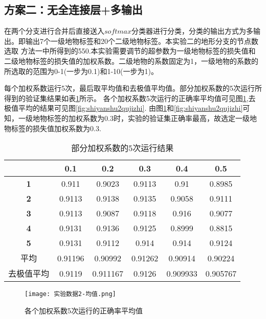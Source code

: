 \documentclass[lang=cn,11pt,a4paper,cite=authoryear]{elegantpaper}
\begin{document}
\subsection{方案二：无全连接层+多输出}
在两个分支进行合并后直接送入$softmax$分类器进行分类，分类的输出方式为多输出。即输出7个一级地物标签和20个二级地物标签。本实验二的地形分支的节点数选取
方法一中所得到的550.本实验需要调节的超参数为一级地物标签的损失值和二级地物标签的损失值的加权系数。二级地物的系数固定为1，一级地物的系数的所选取的范围为0-1(一步为0.1)和1-10(一步为1)。

每个加权系数运行5次，最后取平均值和去极值平均值。部分加权系数的5次运行所得到的验证集结果如表\ref{tab:table2}所示。
各个加权系数5次运行的正确率平均值可见图\ref{fig:shiyanshu2junzhi},去极值平均的结果可见图\ref{fig:shiyanshu2qujizhi}.
由图\ref{fig:shiyanshu2junzhi}和\ref{fig:shiyanshu2qujizhi}可知，一级地物标签的加权系数为0.3时，实验的验证集正确率最高，故选定一级地物标签的损失值加权系数为0.3.

\begin{table}[htbp]
  \centering
  \caption{部分加权系数的5次运行结果}
    \begin{tabular}{|c|c|c|c|c|c|}
    \toprule
          & \textbf{0.1} & \textbf{0.2} & \textbf{0.3} & \textbf{0.4} & \textbf{0.5} \\
    \midrule
    \textbf{1} & 0.911 & 0.9023 & 0.9113 & 0.91  & 0.8985 \\
    \midrule
    \textbf{2} & 0.9113 & 0.9138 & 0.9135 & 0.9058 & 0.9111 \\
    \midrule
    \textbf{3} & 0.9113 & 0.9087 & 0.9118 & 0.916 & 0.9077 \\
    \midrule
    \textbf{4} & 0.9131 & 0.9136 & 0.9125 & 0.8999 & 0.8815 \\
    \midrule
    \textbf{5} & 0.9131 & 0.9112 & 0.914 & 0.914 & 0.9124 \\
    \midrule
    平均    & \cellcolor[rgb]{ 1,  0,  0}0.91196 & 0.90992 & \cellcolor[rgb]{ .753,  0,  0}0.91262 & 0.90914 & 0.90224 \\
    \midrule
    去极值平均 & \cellcolor[rgb]{ 1,  0,  0}0.9119 & 0.911167 & \cellcolor[rgb]{ .753,  0,  0}0.9126 & 0.909933 & 0.905767 \\
    \bottomrule
    \end{tabular}%
  \label{tab:table2}%
\end{table}%

\begin{figure}[!htb]
  \centering
  \texttt{[image: 实验数据2-均值.png]}
  \caption{各个加权系数5次运行的正确率平均值}
  \label{fig:shiyanshu2junzhi}
\end{figure}
\end{document}
